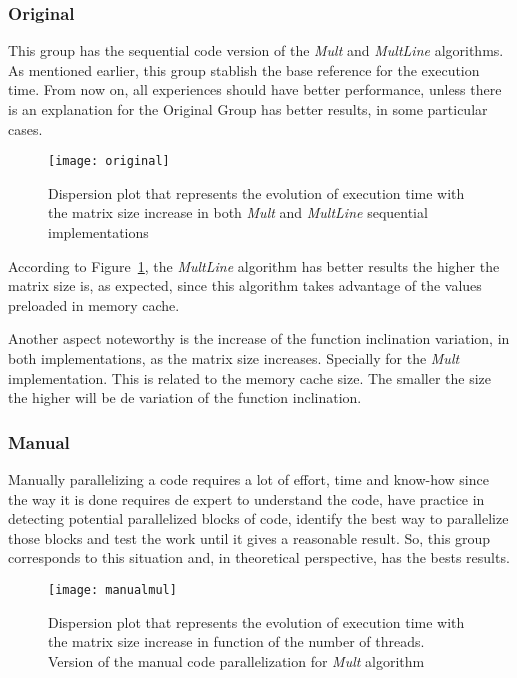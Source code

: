\subsubsection{Original}

This group has the sequential code version of the \textit{Mult} and \textit{MultLine} algorithms. As mentioned earlier, this group stablish the base reference for the execution time. From now on, all experiences should have better performance, unless there is an explanation for the Original Group has better results, in some particular cases.

\begin{figure}[htb]
	\begin{center}
		\leavevmode
		\texttt{[image: original]}
		\caption{Dispersion plot that represents the evolution of execution time with the matrix size increase in both \textit{Mult} and \textit{MultLine} sequential implementations}
		\label{fig:original}
	\end{center}
\end{figure}

According to Figure~\ref{fig:original}, the \textit{MultLine} algorithm has better results the higher the matrix size is, as expected, since this algorithm takes advantage of the values preloaded in memory cache.

Another aspect noteworthy is the increase of the function inclination variation, in both implementations, as the matrix size increases. Specially for the  \textit{Mult} implementation. This is related to the memory cache size. The smaller the size the higher will be de variation of the function inclination.

\subsubsection{Manual}\label{subsubsec:manual}

Manually parallelizing a code requires a lot of effort, time and know-how since the way it is done requires de expert to understand the code, have practice in detecting potential parallelized blocks of code, identify the best way to parallelize those blocks and test the work until it gives a reasonable result.
So, this group corresponds to this situation and, in theoretical perspective, has the bests results. 

\begin{figure}[htb]
	\begin{center}
		\leavevmode
		\texttt{[image: manualmul]}
		\caption{Dispersion plot that represents the evolution of execution time with the matrix size increase in function of the number of threads. Version of the manual code parallelization for \textsl{Mult} algorithm}
		\label{fig:manualmul}
	\end{center}
\end{figure}

